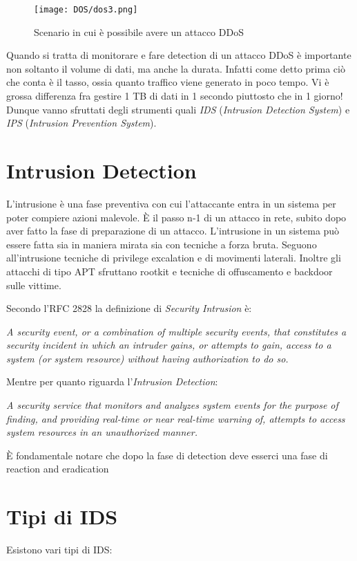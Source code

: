 \documentclass[14pt]{extreport}
\begin{document}
\begin{figure}[H]
    \centering
    \texttt{[image: DOS/dos3.png]}
    \caption{Scenario in cui è possibile avere un attacco DDoS}
\end{figure}


Quando si tratta di monitorare e fare detection di un attacco DDoS è importante non soltanto il volume di dati, ma anche la durata. Infatti come detto prima ciò che conta è il tasso, ossia quanto traffico viene generato in poco tempo. Vi è grossa differenza fra gestire 1 TB di dati in 1 secondo piuttosto che in 1 giorno!
Dunque vanno sfruttati degli strumenti quali \textit{IDS} (\textit{Intrusion Detection System}) e \textit{IPS} (\textit{Intrusion Prevention System}).


\section{Intrusion Detection}
L'intrusione è una fase preventiva con cui l'attaccante entra in un sistema per poter compiere azioni malevole. È il passo n-1 di un attacco in rete, subito dopo aver fatto la fase di preparazione di un attacco. L'intrusione in un sistema può essere fatta sia in maniera mirata sia con tecniche a forza bruta. Seguono all'intrusione tecniche di privilege excalation e di movimenti laterali. Inoltre gli attacchi di tipo APT sfruttano rootkit e tecniche di offuscamento e backdoor sulle vittime.


Secondo l'RFC 2828 la definizione di \textit{Security Intrusion} è:


\begin{center}
    \textit{A security event, or a combination of multiple security events, that constitutes a security incident in which an intruder gains, or attempts to gain, access to a system (or system resource) without having authorization to do so.}
\end{center}
Mentre per quanto riguarda l'\textit{Intrusion Detection}:


\begin{center}
    \textit{A security service that monitors and analyzes system events for the purpose of finding, and providing real-time or near real-time warning of, attempts to access system resources in an unauthorized manner.}
\end{center}
È fondamentale notare che dopo la fase di detection deve esserci una fase di reaction and eradication


\section{Tipi di IDS}
Esistono vari tipi di IDS:
\end{document}
